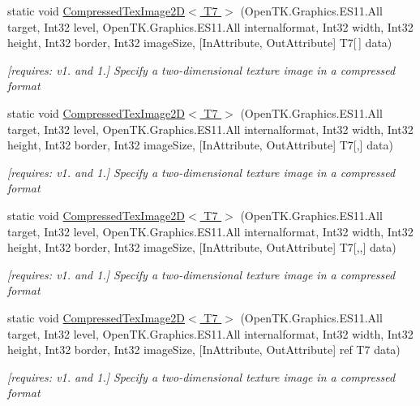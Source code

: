 \begin{DoxyCompactItemize}
static void \hyperlink{class_open_t_k_1_1_graphics_1_1_e_s11_1_1_g_l_a988bc41c818fb8e9ce5f47b087a4bd07}{Compressed\-Tex\-Image2\-D$<$ T7 $>$} (Open\-T\-K.\-Graphics.\-E\-S11.\-All target, Int32 level, Open\-T\-K.\-Graphics.\-E\-S11.\-All internalformat, Int32 width, Int32 height, Int32 border, Int32 image\-Size, \mbox{[}In\-Attribute, Out\-Attribute\mbox{]} T7\mbox{[}$\,$\mbox{]} data)
\begin{DoxyCompactList}\small\item\em \mbox{[}requires\-: v1. and 1.\mbox{]} Specify a two-\/dimensional texture image in a compressed format \end{DoxyCompactList}\item 
static void \hyperlink{class_open_t_k_1_1_graphics_1_1_e_s11_1_1_g_l_abea9b1fcffb1517a4dde929046bcfeb1}{Compressed\-Tex\-Image2\-D$<$ T7 $>$} (Open\-T\-K.\-Graphics.\-E\-S11.\-All target, Int32 level, Open\-T\-K.\-Graphics.\-E\-S11.\-All internalformat, Int32 width, Int32 height, Int32 border, Int32 image\-Size, \mbox{[}In\-Attribute, Out\-Attribute\mbox{]} T7\mbox{[},\mbox{]} data)
\begin{DoxyCompactList}\small\item\em \mbox{[}requires\-: v1. and 1.\mbox{]} Specify a two-\/dimensional texture image in a compressed format \end{DoxyCompactList}\item 
static void \hyperlink{class_open_t_k_1_1_graphics_1_1_e_s11_1_1_g_l_a103b5ccd0f794d0ccf56083ed095702e}{Compressed\-Tex\-Image2\-D$<$ T7 $>$} (Open\-T\-K.\-Graphics.\-E\-S11.\-All target, Int32 level, Open\-T\-K.\-Graphics.\-E\-S11.\-All internalformat, Int32 width, Int32 height, Int32 border, Int32 image\-Size, \mbox{[}In\-Attribute, Out\-Attribute\mbox{]} T7\mbox{[},,\mbox{]} data)
\begin{DoxyCompactList}\small\item\em \mbox{[}requires\-: v1. and 1.\mbox{]} Specify a two-\/dimensional texture image in a compressed format \end{DoxyCompactList}\item 
static void \hyperlink{class_open_t_k_1_1_graphics_1_1_e_s11_1_1_g_l_ad68055c6c38e8684d2510286a7327adb}{Compressed\-Tex\-Image2\-D$<$ T7 $>$} (Open\-T\-K.\-Graphics.\-E\-S11.\-All target, Int32 level, Open\-T\-K.\-Graphics.\-E\-S11.\-All internalformat, Int32 width, Int32 height, Int32 border, Int32 image\-Size, \mbox{[}In\-Attribute, Out\-Attribute\mbox{]} ref T7 data)
\begin{DoxyCompactList}\small\item\em \mbox{[}requires\-: v1. and 1.\mbox{]} Specify a two-\/dimensional texture image in a compressed format \end{DoxyCompactList}\item 

\end{DoxyCompactItemize}
